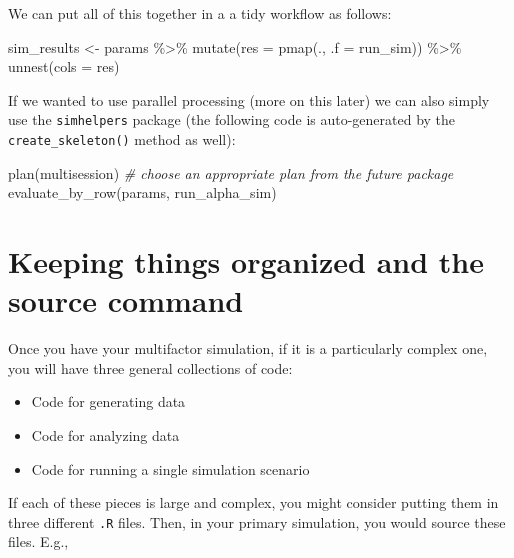 \documentclass[
]{book}
\newenvironment{Shaded}{\begin{snugshade}}{\end{snugshade}}
\newcommand{\AttributeTok}[1]{\textcolor[rgb]{0.77,0.63,0.00}{#1}}
\newcommand{\CommentTok}[1]{\textcolor[rgb]{0.56,0.35,0.01}{\textit{#1}}}
\newcommand{\FunctionTok}[1]{\textcolor[rgb]{0.00,0.00,0.00}{#1}}
\newcommand{\NormalTok}[1]{#1}
\newcommand{\OtherTok}[1]{\textcolor[rgb]{0.56,0.35,0.01}{#1}}
\newcommand{\SpecialCharTok}[1]{\textcolor[rgb]{0.00,0.00,0.00}{#1}}
\providecommand{\tightlist}{%
  \setlength{\itemsep}{0pt}\setlength{\parskip}{0pt}}
\begin{document}
We can put all of this together in a a tidy workflow as follows:

\begin{Shaded}
\begin{Highlighting}[]
\NormalTok{sim\_results }\OtherTok{\textless{}{-}} 
\NormalTok{  params }\SpecialCharTok{\%\textgreater{}\%}
  \FunctionTok{mutate}\NormalTok{(}\AttributeTok{res =} \FunctionTok{pmap}\NormalTok{(., }\AttributeTok{.f =}\NormalTok{ run\_sim)) }\SpecialCharTok{\%\textgreater{}\%}
  \FunctionTok{unnest}\NormalTok{(}\AttributeTok{cols =}\NormalTok{ res)}
\end{Highlighting}
\end{Shaded}

If we wanted to use parallel processing (more on this later) we can also simply use the \texttt{simhelpers} package (the following code is auto-generated by the \texttt{create\_skeleton()} method as well):

\begin{Shaded}
\begin{Highlighting}[]
\FunctionTok{plan}\NormalTok{(multisession) }\CommentTok{\# choose an appropriate plan from the future package}
\FunctionTok{evaluate\_by\_row}\NormalTok{(params, run\_alpha\_sim)}
\end{Highlighting}
\end{Shaded}

\hypertarget{keeping-things-organized-and-the-source-command}{%
\section{Keeping things organized and the source command}\label{keeping-things-organized-and-the-source-command}}

Once you have your multifactor simulation, if it is a particularly complex one, you will have three general collections of code:

\begin{itemize}
\tightlist
\item
  Code for generating data
\item
  Code for analyzing data
\item
  Code for running a single simulation scenario
\end{itemize}

If each of these pieces is large and complex, you might consider putting them in three different \texttt{.R} files.
Then, in your primary simulation, you would source these files.
E.g.,
\end{document}
